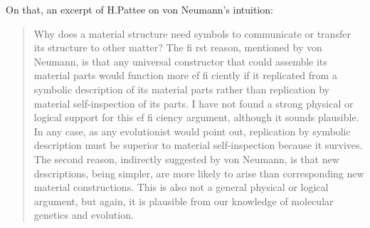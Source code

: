 \documentclass[a4paper,12pt,twoside,leqno]{article}
\begin{document}
On that, an excerpt of H.Pattee on von Neumann's intuition:
\begin{quote}
Why does a material structure need symbols to communicate or transfer its
structure to other matter? The fi rst reason, mentioned by von Neumann, is that any
universal constructor that could assemble its material parts would function more
ef fi ciently if it replicated from a symbolic description of its material parts rather
than replication by material self-inspection of its parts. I have not found a strong
physical or logical support for this ef fi ciency argument, although it sounds plausible.
In any case, as any evolutionist would point out, replication by symbolic description
must be superior to material self-inspection because it survives. The second reason,
indirectly suggested by von Neumann, is that new descriptions, being simpler, are
more likely to arise than corresponding new material constructions. This is also not
a general physical or logical argument, but again, it is plausible from our knowledge
of molecular genetics and evolution.
\end{quote}
\end{document}
